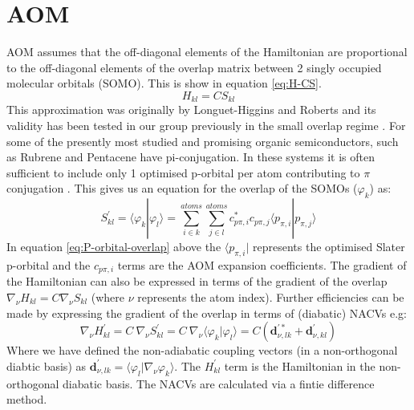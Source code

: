\section{AOM}
AOM assumes that the off-diagonal elements of the Hamiltonian are proportional to the off-diagonal elements of the overlap matrix between 2 singly occupied molecular orbitals (SOMO). This is show in equation \eqref{eq:H-CS}.
\begin{equation}
    H_{kl} = C S_{kl}
    \label{eq:H-CS}
\end{equation}
This approximation was originally by Longuet-Higgins and Roberts \cite{Prezhdo1997Oct} and its validity has been tested in our group previously in the small overlap regime \cite{gajdos_ultrafast_2014}.  For some of the presently most studied and promising organic semiconductors, such as Rubrene \cite{Braga2009Feb,Baris2014Aug} and Pentacene \cite{Tiwari2010May, Kim2015Dec} have pi-conjugation. In these systems it is often sufficient to include only 1 optimised p-orbital per atom contributing to
$\pi$ conjugation \cite{spencer_fob-sh:_2016}. This gives us an equation for the overlap of the SOMOs ($\varphi_{k}$) as:
\begin{equation}
    S_{kl}^{'} = \langle \varphi_{k} | \varphi_{l} \rangle = \sum_{i \in k}^{atoms} \sum_{j \in l}^{atoms} c_{p\pi, i}^{*} c_{p\pi, j} \langle p_{\pi, i}|p_{\pi, j}\rangle
    \label{eq:P-orbital-overlap}
\end{equation}
In equation \eqref{eq:P-orbital-overlap} above the $\langle p_{\pi, i} |$ represents the optimised Slater p-orbital and the $c_{p\pi, i}$ terms are the AOM expansion coefficients. The gradient of the Hamiltonian can also be expressed in terms of the gradient of the overlap $\nabla_{\nu} H_{kl} = C \nabla_{\nu} S_{kl}$ (where $\nu$ represents the atom index). Further efficiencies can be made by expressing the gradient of the overlap in terms of (diabatic) NACVs e.g:
\begin{equation}
  \nabla_{\nu} H_{kl}^{'} = C \ \nabla_{\nu} S_{kl}^{'} = C \ \nabla_{\nu} \langle \varphi_{k} | \varphi_{l} \rangle = C ( \textbf{d}_{\nu, lk}^{'*} + \textbf{d}_{\nu, kl}^{'} )
\end{equation}
Where we have defined the non-adiabatic coupling vectors (in a non-orthogonal diabtic basis) as $\textbf{d}^{'}_{\nu, lk} = \langle \varphi_{l}  | \nabla_{\nu} \varphi_{k}\rangle$. The $H^{'}_{kl}$ term is the Hamiltonian in the non-orthogonal diabatic basis. The NACVs are calculated via a fintie difference method.

